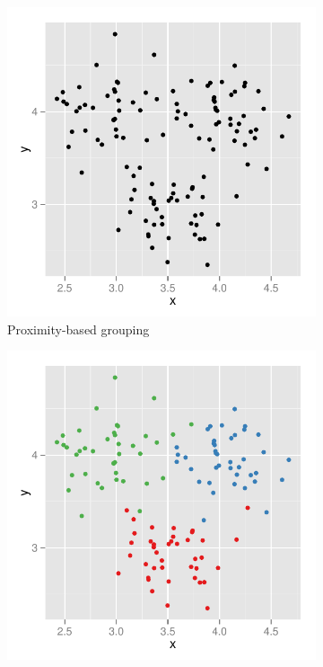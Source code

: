 \documentclass[11pt]{isuthesis}\usepackage[]{graphicx}\usepackage[]{color}
\begin{document}
\begin{figure}[htbp]\centering
\begin{subfigure}[b]{.45\textwidth}\centering
  \includegraphics[width=\textwidth]{fig-clustering1}
  \caption{Proximity-based grouping}
\end{subfigure}\hfill
\begin{subfigure}[b]{.45\textwidth}\centering
  \includegraphics[width=\textwidth]{fig-clustering2}

\end{subfigure}
\end{figure}
\end{document}
